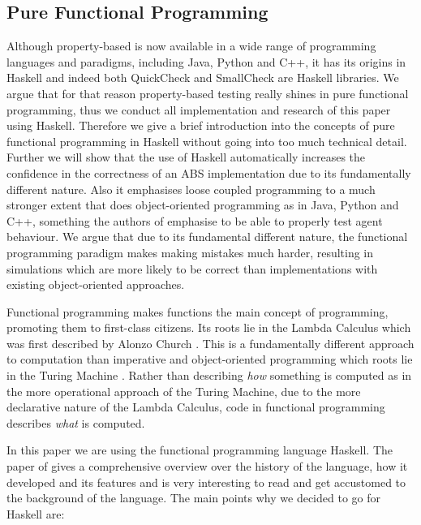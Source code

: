 \subsection{Pure Functional Programming}
Although property-based is now available in a wide range of programming languages and paradigms, including Java, Python and C++, it has its origins in Haskell and indeed both QuickCheck and SmallCheck are Haskell libraries. We argue that for that reason property-based testing really shines in pure functional programming, thus we conduct all implementation and research of this paper using Haskell. Therefore we give a brief introduction into the concepts of pure functional programming in Haskell without going into too much technical detail. Further we will show that the use of Haskell automatically increases the confidence in the correctness of an ABS implementation due to its fundamentally different nature. Also it emphasises loose coupled programming to a much stronger extent that does object-oriented programming as in Java, Python and C++, something the authors of \cite{collier_test-driven_2013} emphasise to be able to properly test agent behaviour. We argue that due to its fundamental different nature, the functional programming paradigm makes making mistakes much harder, resulting in simulations which are more likely to be correct than implementations with existing object-oriented approaches.

Functional programming makes functions the main concept of programming, promoting them to first-class citizens. Its roots lie in the Lambda Calculus which was first described by Alonzo Church \citep{church_unsolvable_1936}. This is a fundamentally different approach to computation than imperative and object-oriented programming which roots lie in the Turing Machine \citep{turing_computable_1937}. Rather than describing \textit{how} something is computed as in the more operational approach of the Turing Machine, due to the more declarative nature of the Lambda Calculus, code in functional programming describes \textit{what} is computed.

In this paper we are using the functional programming language Haskell. The paper of \citep{hudak_history_2007} gives a comprehensive overview over the history of the language, how it developed and its features and is very interesting to read and get accustomed to the background of the language. The main points why we decided to go for Haskell are:

